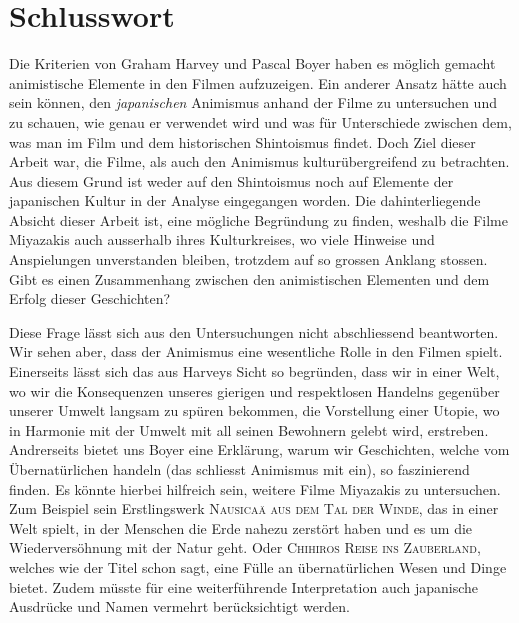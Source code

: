 \section*{Schlusswort}
Die Kriterien von Graham Harvey und Pascal Boyer haben es möglich gemacht animistische Elemente in den Filmen aufzuzeigen. Ein anderer Ansatz hätte auch sein können, den \emph{japanischen} Animismus anhand der Filme zu untersuchen und zu schauen, wie genau er verwendet wird und was für Unterschiede zwischen dem, was man im Film und dem historischen Shintoismus findet. Doch Ziel dieser Arbeit war, die Filme, als auch den Animismus kulturübergreifend zu betrachten. Aus diesem Grund ist weder auf den Shintoismus noch auf Elemente der japanischen Kultur in der Analyse eingegangen worden. Die dahinterliegende Absicht dieser Arbeit ist, eine mögliche Begründung zu finden, weshalb die Filme Miyazakis auch ausserhalb ihres Kulturkreises, wo viele Hinweise und Anspielungen unverstanden bleiben, trotzdem auf so grossen Anklang stossen. Gibt es einen Zusammenhang zwi\-schen den animistischen Elementen und dem Erfolg dieser Geschichten?

Diese Frage lässt sich aus den Untersuchungen nicht abschliessend beantworten. Wir sehen aber, dass der Animismus eine wesentliche Rolle in den Filmen spielt. Einerseits lässt sich das aus Harveys Sicht so begründen, dass wir in einer Welt, wo wir die Konsequenzen unseres gierigen und respektlosen Handelns gegenüber unserer Umwelt langsam zu spüren bekommen, die Vorstellung einer Utopie, wo in Harmonie mit der Umwelt mit all seinen Bewohnern gelebt wird, erstreben. Andrerseits bietet uns Boyer eine Erklärung, warum wir Geschichten, welche vom Übernatürlichen handeln (das schliesst Animismus mit ein), so faszinierend finden. Es könnte hierbei hilfreich sein, weitere Filme Miyazakis zu untersuchen. Zum Beispiel sein Erstlingswerk \textsc{Nausicaä aus dem Tal der Winde}, das in einer Welt spielt, in der Menschen die Erde nahezu zerstört haben und es um die Wiederversöhnung mit der Natur geht. Oder \textsc{Chihiros Reise ins Zauberland}, welches wie der Titel schon sagt, eine Fülle an übernatürlichen Wesen und Dinge bietet. Zudem müsste für eine weiterführende Interpretation auch japanische Ausdrücke und Namen vermehrt berücksichtigt werden.